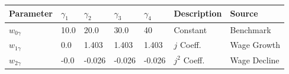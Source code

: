 \small\begin{tabular}{l l l l l l l} 
\hline 
 Parameter & $\gamma_1$ &  $\gamma_2$ & $\gamma_3$ & $\gamma_4$ & Description & Source \\ 
\hline 
$w_{0\gamma}$ & 10.0 & 20.0 
               & 30.0 & 40 
               & Constant & Benchmark \\ 
$w_{1\gamma}$ & 0.0 &  1.403 
               & 1.403 & 1.403 
               & $j$ Coeff. & Wage Growth \\ 
$w_{2\gamma}$ & -0.0 &  -0.026 
               & -0.026 & -0.026 
               & $j^{2}$ Coeff. & Wage Decline \\ 
\hline 
\end{tabular}